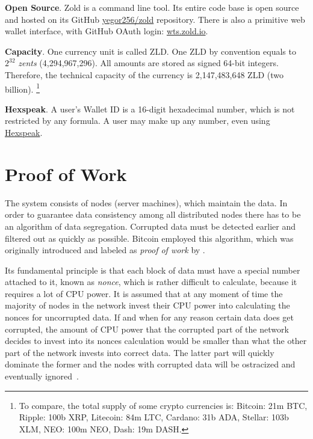\documentclass[11pt,oneside]{article}
\begin{document}
\textbf{Open Source}.
Zold is a command line tool. Its entire code base is open source
and hosted on its GitHub \href{https://github.com/yegor256/zold}{yegor256/zold}
repository. There is also a primitive web wallet interface, with
GitHub OAuth login: \href{https://wts.zold.io}{wts.zold.io}.

\textbf{Capacity}.
One currency unit is called ZLD.
One ZLD by convention equals to $2^{32}$ \emph{zents} (4,294,967,296).
All amounts are stored as signed 64-bit integers.
Therefore, the technical capacity of the currency is 2,147,483,648 ZLD (two billion).%
\footnote{%
  To compare, the total supply of some crypto currencies is:
  Bitcoin: 21m BTC,
  Ripple: 100b XRP,
  Litecoin: 84m LTC,
  Cardano: 31b ADA,
  Stellar: 103b XLM,
  NEO: 100m NEO,
  Dash: 19m DASH.
}

\textbf{Hexspeak}.
A user's Wallet ID is a 16-digit hexadecimal number, which is not restricted by any formula.
A user may make up any number, even using
\href{https://en.wikipedia.org/wiki/Hexspeak}{Hexspeak}.

\section{Proof of Work}\label{sec:score}

The system consists of nodes (server machines), which maintain the data.
In order to guarantee data consistency among all distributed nodes
there has to be an algorithm of data segregation.
Corrupted data must be detected earlier and filtered out as quickly as possible.
Bitcoin employed this algorithm, which was originally introduced and labeled as
\emph{proof of work} by \textcite{back1997}.

Its fundamental principle is that each block of data must have a special
number attached to it, known as \emph{nonce}, which is rather difficult to calculate,
because it requires a lot of CPU power. It is assumed that at any moment
of time the majority of nodes in the network invest their CPU power into
calculating the nonces for uncorrupted data. If and when for any reason
certain data does get corrupted, the amount of CPU power that the corrupted part of the network
decides to invest into its nonces calculation would be smaller than what
the other part of the network invests into correct data. The latter part
will quickly dominate the former and the nodes with corrupted data will
be ostracized and eventually ignored~\parencite{nakamoto2008}.
\end{document}

